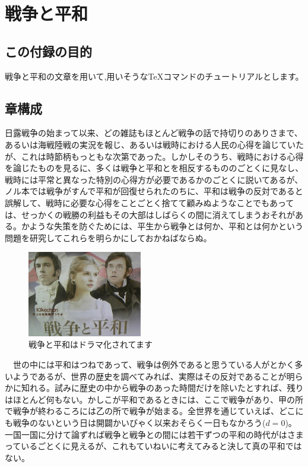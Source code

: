 \chapter{戦争と平和}

\section{この付録の目的}
戦争と平和の文章を用いて,用いそうな\TeX コマンドのチュートリアルとします。

\section{章構成}

日露戦争の始まって以来、どの雑誌もほとんど戦争の話で持切りのありさまで、あるいは海戦陸戦の実況を報じ、あるいは戦時における人民の心得を論じていたが、これは時節柄もっともな次第であった。しかしそのうち、戦時における心得を論じたものを見るに、多くは戦争と平和とを相反するもののごとくに見なし、戦時には平常と異なった特別の心得方が必要であるかのごとくに説いてあるが、ノル本\cite{knoll}では戦争がすんで平和が回復せられたのちに、平和は戦争の反対であると誤解して、戦時に必要な心得をことごとく捨てて顧みぬようなことでもあっては、せっかくの戦勝の利益もその大部はしばらくの間に消えてしまうおそれがある。かような失策を防ぐためには、平生から戦争とは何か、平和とは何かという問題を研究してこれらを明らかにしておかねばならぬ。

\begin{figure}[htbp]
	\centering
		\includegraphics[width=5cm]{img/war_and_peace.jpg}
	\caption{戦争と平和はドラマ化されてます}
	\label{warAndPeace}
\end{figure}

　世の中には平和はつねであって、戦争は例外であると思うている人がとかく多いようであるが、世界の歴史を調べてみれば、実際はその反対であることが明らかに知れる。試みに歴史の中から戦争のあった時間だけを除いたとすれば、残りはほとんど何もない。かしこが平和であるときには、ここで戦争があり、甲の所で戦争が終わるころには乙の所で戦争が始まる。全世界を通じていえば、どこにも戦争のないという日は開闢かいびゃく以来おそらく一日もなかろう($d=0$)。一国一国に分けて論ずれば戦争と戦争との間には若干ずつの平和の時代がはさまっているごとくに見えるが、これもていねいに考えてみると決して真の平和ではない。

